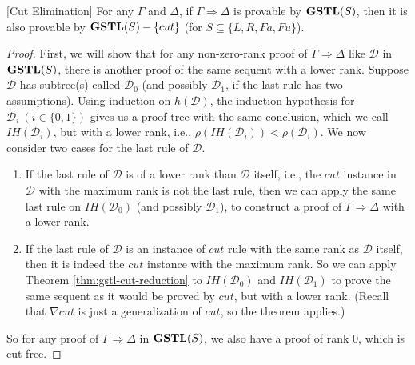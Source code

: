 \begin{thm}\label{thm:gstl-cut-elim}[Cut Elimination]
	For any $\Gamma$ and $\Delta$, if $\Gamma \Rightarrow \Delta$ is provable by $\mathbf{GSTL}(S)$, then it is also provable by $\mathbf{GSTL}(S)-\{cut\}$ (for $S \subseteq \{ L, R, Fa, Fu \}$).
\end{thm}
\begin{proof}
		First, we will show that for any non-zero-rank proof of $\Gamma \Rightarrow \Delta$ like $\mathcal{D}$ in $\mathbf{GSTL}(S)$, there is another proof of the same sequent with a lower rank. Suppose $\mathcal{D}$ has subtree(s) called $\mathcal{D}_0$ (and possibly $\mathcal{D}_1$, if the last rule has two assumptions). Using induction on $h(\mathcal{D})$, the induction hypothesis for $\mathcal{D}_i ~(i \in \{0,1\})$ gives us a proof-tree with the same conclusion, which we call $IH(\mathcal{D}_i)$, but with a lower rank, i.e., $\rho(IH(\mathcal{D}_i)) < \rho(\mathcal{D}_i)$. We now consider two cases for the last rule of $\mathcal{D}$.

	\begin{enumerate}[label=\Roman*]
		\item If the last rule of $\mathcal{D}$ is of a lower rank than $\mathcal{D}$ itself, i.e., the $cut$ instance in $\mathcal{D}$ with the maximum rank is not the last rule, then we can apply the same last rule on $IH(\mathcal{D}_0)$ (and possibly $\mathcal{D}_1$), to construct a proof of $\Gamma \Rightarrow \Delta$ with a lower rank.
		
		\item If the last rule of $\mathcal{D}$ is an instance of $cut$ rule with the same rank as $\mathcal{D}$ itself, then it is indeed the $cut$ instance with the maximum rank. So we can apply Theorem \ref{thm:gstl-cut-reduction} to $IH(\mathcal{D}_0)$ and $IH(\mathcal{D}_1)$ to prove the same sequent as it would be proved by $cut$, but with a lower rank. (Recall that $\nabla cut$ is just a generalization of $cut$, so the theorem applies.)
	\end{enumerate}
	So for any proof of $\Gamma \Rightarrow \Delta$ in $\mathbf{GSTL}(S)$, we also have a proof of rank $0$, which is cut-free.
\end{proof}